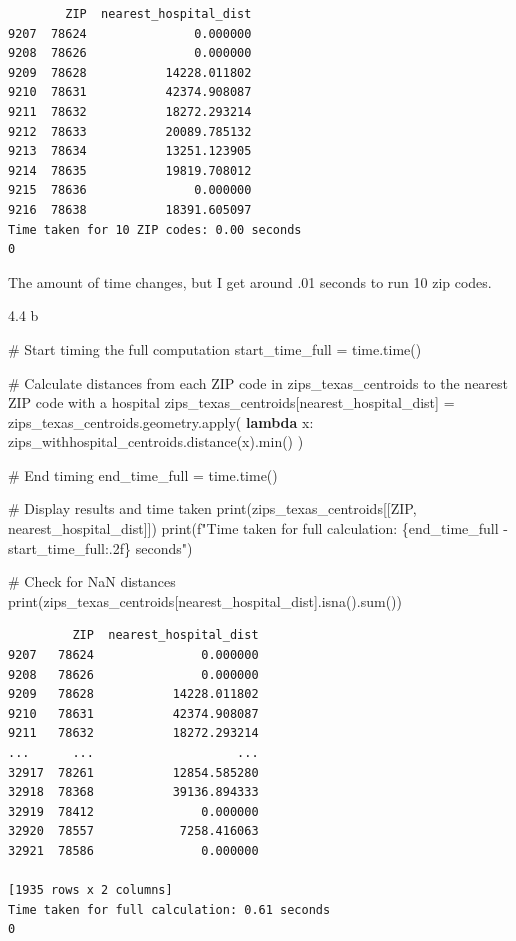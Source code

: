 \documentclass[
  letterpaper,
  DIV=11,
  numbers=noendperiod]{scrartcl}
\newenvironment{Shaded}{\begin{snugshade}}{\end{snugshade}}
\newcommand{\BuiltInTok}[1]{\textcolor[rgb]{0.00,0.23,0.31}{#1}}
\newcommand{\CommentTok}[1]{\textcolor[rgb]{0.37,0.37,0.37}{#1}}
\newcommand{\KeywordTok}[1]{\textcolor[rgb]{0.00,0.23,0.31}{\textbf{#1}}}
\newcommand{\NormalTok}[1]{\textcolor[rgb]{0.00,0.23,0.31}{#1}}
\newcommand{\OperatorTok}[1]{\textcolor[rgb]{0.37,0.37,0.37}{#1}}
\newcommand{\SpecialCharTok}[1]{\textcolor[rgb]{0.37,0.37,0.37}{#1}}
\newcommand{\SpecialStringTok}[1]{\textcolor[rgb]{0.13,0.47,0.30}{#1}}
\newcommand{\StringTok}[1]{\textcolor[rgb]{0.13,0.47,0.30}{#1}}
\begin{document}
\begin{verbatim}
        ZIP  nearest_hospital_dist
9207  78624               0.000000
9208  78626               0.000000
9209  78628           14228.011802
9210  78631           42374.908087
9211  78632           18272.293214
9212  78633           20089.785132
9213  78634           13251.123905
9214  78635           19819.708012
9215  78636               0.000000
9216  78638           18391.605097
Time taken for 10 ZIP codes: 0.00 seconds
0
\end{verbatim}

The amount of time changes, but I get around .01 seconds to run 10 zip
codes.

4.4 b

\begin{Shaded}
\begin{Highlighting}[]
\CommentTok{\# Start timing the full computation}
\NormalTok{start\_time\_full }\OperatorTok{=}\NormalTok{ time.time()}

\CommentTok{\# Calculate distances from each ZIP code in zips\_texas\_centroids to the nearest ZIP code with a hospital}
\NormalTok{zips\_texas\_centroids[}\StringTok{\textquotesingle{}nearest\_hospital\_dist\textquotesingle{}}\NormalTok{] }\OperatorTok{=}\NormalTok{ zips\_texas\_centroids.geometry.}\BuiltInTok{apply}\NormalTok{(}
    \KeywordTok{lambda}\NormalTok{ x: zips\_withhospital\_centroids.distance(x).}\BuiltInTok{min}\NormalTok{()}
\NormalTok{)}

\CommentTok{\# End timing}
\NormalTok{end\_time\_full }\OperatorTok{=}\NormalTok{ time.time()}

\CommentTok{\# Display results and time taken}
\BuiltInTok{print}\NormalTok{(zips\_texas\_centroids[[}\StringTok{\textquotesingle{}ZIP\textquotesingle{}}\NormalTok{, }\StringTok{\textquotesingle{}nearest\_hospital\_dist\textquotesingle{}}\NormalTok{]])}
\BuiltInTok{print}\NormalTok{(}\SpecialStringTok{f"Time taken for full calculation: }\SpecialCharTok{\{}\NormalTok{end\_time\_full }\OperatorTok{{-}}\NormalTok{ start\_time\_full}\SpecialCharTok{:.2f\}}\SpecialStringTok{ seconds"}\NormalTok{)}

\CommentTok{\# Check for NaN distances}
\BuiltInTok{print}\NormalTok{(zips\_texas\_centroids[}\StringTok{\textquotesingle{}nearest\_hospital\_dist\textquotesingle{}}\NormalTok{].isna().}\BuiltInTok{sum}\NormalTok{())}
\end{Highlighting}
\end{Shaded}

\begin{verbatim}
         ZIP  nearest_hospital_dist
9207   78624               0.000000
9208   78626               0.000000
9209   78628           14228.011802
9210   78631           42374.908087
9211   78632           18272.293214
...      ...                    ...
32917  78261           12854.585280
32918  78368           39136.894333
32919  78412               0.000000
32920  78557            7258.416063
32921  78586               0.000000

[1935 rows x 2 columns]
Time taken for full calculation: 0.61 seconds
0
\end{verbatim}
\end{document}
